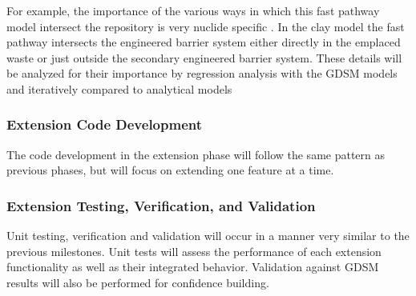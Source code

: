   For example, the importance of the various 
  ways in which this fast pathway model intersect  the repository is very nuclide
  specific \cite{clayton_generic_2011}. In the clay model the fast pathway intersects the 
  engineered barrier system either directly in the emplaced waste or just outside 
  the secondary engineered barrier system. These details will be analyzed for 
  their importance by regression analysis with the \gls{GDSM} models and 
  iteratively compared to analytical models 

  \subsubsection{Extension Code Development}


  The code development in the extension phase will follow the same pattern as 
  previous phases, but will focus on extending one feature at a time. 

  \subsubsection{Extension Testing, Verification, and Validation}


  Unit testing, verification and validation will occur in a manner very similar 
  to the previous milestones. Unit tests will assess the performance of each 
  extension functionality as well as their integrated behavior. Validation 
  against \gls{GDSM} results will also be performed for confidence building. 




